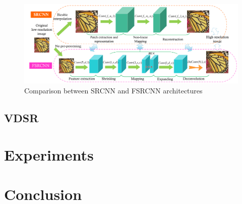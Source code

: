 \documentclass[10pt,twocolumn,letterpaper]{article}
\begin{document}
\begin{figure}[!]
	\centering
	\includegraphics[width=\textwidth]{img/fsrcnn.png}
	\caption{Comparison between SRCNN and FSRCNN architectures \cite{dong2014image}}
\end{figure}

\subsection{VDSR}



\section{Experiments}

\section{Conclusion}

{\small


}
\end{document}
